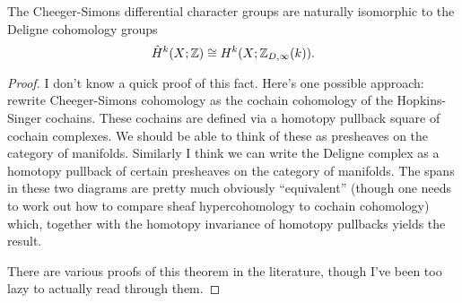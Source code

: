 \documentclass{amsart}
\begin{document}
\begin{theorem}
    The Cheeger-Simons differential character groups are naturally isomorphic to
    the Deligne cohomology groups
    \begin{equation*}
        \hat H^k(X;\mathbb{Z}) \cong H^k(X;\mathbb{Z}_{D,\infty}(k)).
    \end{equation*}
\end{theorem}
\begin{proof}
    I don't know a quick proof of this fact. Here's one possible approach:
    rewrite Cheeger-Simons cohomology as the cochain cohomology of the
    Hopkins-Singer cochains. These cochains are defined via a homotopy pullback
    square of cochain complexes. We should be able to think of these as
    presheaves on the category of manifolds. Similarly I think we can write
    the Deligne complex as a homotopy pullback of certain presheaves on the
    category of manifolds. The spans in these two diagrams are pretty much
    obviously ``equivalent'' (though one needs to work out how to compare
    sheaf hypercohomology to cochain cohomology) which, together with the
    homotopy invariance of homotopy pullbacks yields the result. 

    There are various proofs of this theorem in the literature, though I've
    been too lazy to actually read through them.
\end{proof}
\end{document}
